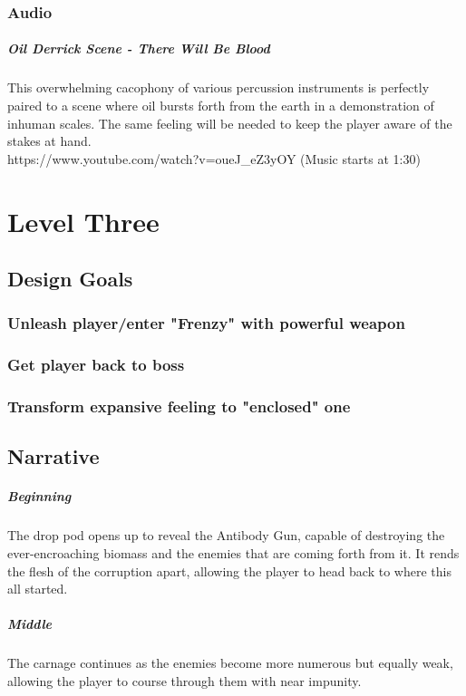 \documentclass[letterpaper]{report}
\begin{document}
			\subsection{Audio}
				\paragraph{Oil Derrick Scene - There Will Be Blood} This overwhelming cacophony of various percussion instruments is perfectly paired to a scene where oil bursts forth from the earth in a demonstration of inhuman scales. The same feeling will be needed to keep the player aware of the stakes at hand. \\
				https://www.youtube.com/watch?v=oueJ\_eZ3yOY (Music starts at 1:30)
				
	\chapter{Level Three}
		\section{Design Goals}
			\subsection{Unleash player/enter "Frenzy" with powerful weapon}
			\subsection{Get player back to boss}
			\subsection{Transform expansive feeling to "enclosed" one}
		\section{Narrative}
			\paragraph{Beginning} The drop pod opens up to reveal the Antibody Gun, capable of destroying the ever-encroaching biomass and the enemies that are coming forth from it. It rends the flesh of the corruption apart, allowing the player to head back to where this all started.
			\paragraph{Middle} The carnage continues as the enemies become more numerous but equally weak, allowing the player to course through them with near impunity.
\end{document}
